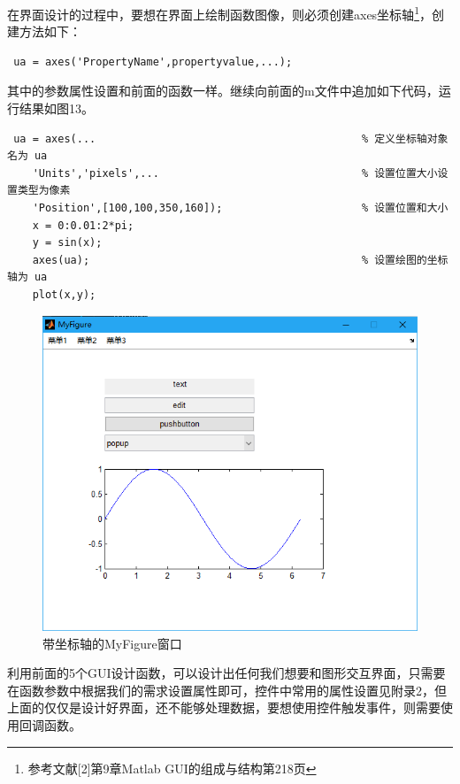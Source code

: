 \begin{enumerate}
	\qquad 在界面设计的过程中，要想在界面上绘制函数图像，则必须创建axes坐标轴\footnote{参考文献[2]第9章Matlab GUI的组成与结构第218页}，创建方法如下：
	\begin{lstlisting}
 ua = axes('PropertyName',propertyvalue,...);\end{lstlisting}
 	其中的参数属性设置和前面的函数一样。继续向前面的m文件中追加如下代码，运行结果如图13。
	 \begin{lstlisting}
 ua = axes(...											% 定义坐标轴对象名为 ua
	'Units','pixels',...								% 设置位置大小设置类型为像素
	'Position',[100,100,350,160]);						% 设置位置和大小
	x = 0:0.01:2*pi;
	y = sin(x);
	axes(ua);											% 设置绘图的坐标轴为 ua
	plot(x,y);\end{lstlisting}
	\begin{figure}[H]
		\centering
		\includegraphics[scale=0.35]{MyFigure_axes}
		\caption{带坐标轴的MyFigure窗口}
	\end{figure}
\end{enumerate}

利用前面的5个GUI设计函数，可以设计出任何我们想要和图形交互界面，只需要在函数参数中根据我们的需求设置属性即可，控件中常用的属性设置见附录2，但上面的仅仅是设计好界面，还不能够处理数据，要想使用控件触发事件，则需要使用回调函数。
